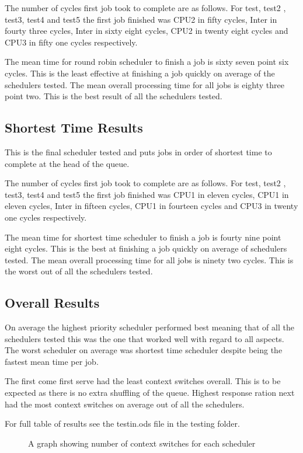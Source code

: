 \documentclass{acm_proc_article-sp}
\begin{document}
The number of cycles first job took to complete are as follows. For test, test2
, test3, test4 and test5 the first job finished was CPU2 in fifty cycles, Inter in fourty three cycles, Inter in sixty eight cycles, CPU2 in twenty eight cycles and CPU3 in fifty one cycles respectively.

The mean time for round robin scheduler to finish a job is sixty seven point six cycles. This is the least effective at finishing a job quickly on average of the schedulers tested. The mean overall processing time for all jobs is eighty three point two. This is the best result of all the schedulers tested.

\subsection{Shortest Time Results}
This is the final scheduler tested and puts jobs in order of shortest time to complete at the head of the queue.

The number of cycles first job took to complete are as follows. For test, test2
, test3, test4 and test5 the first job finished was CPU1 in eleven cycles, CPU1 in eleven cycles, Inter in fifteen cycles, CPU1 in fourteen cycles and CPU3 in twenty one cycles respectively.

The mean time for shortest time scheduler to finish a job is fourty nine point eight cycles. This is the best at finishing a job quickly on average of schedulers tested. The mean overall processing time for all jobs is ninety two cycles. This is the worst out of all the schedulers tested.

\subsection{Overall Results}
On average the highest priority scheduler performed best meaning that of all the schedulers tested this was the one that worked well with regard to all aspects. The worst scheduler on average was shortest time scheduler despite being the fastest mean time per job.

The first come first serve had the least context switches overall. This is to be expected as there is no extra shuffling of the queue. Highest response ration next had the most context switches on average out of all the schedulers.

For full table of results see the testin.ods file in the testing folder.

\begin{figure}
\centering
{}
\caption{A graph showing number of context switches for each scheduler}
\end{figure}
\end{document}
